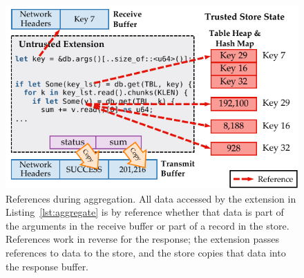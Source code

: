 \begin{figure}[t]
  \includegraphics[width=1.0\columnwidth]{figures/tao-extension.pdf}
  \vspace{2pt}
  \caption{References during aggregation. All data accessed by the extension in
  Listing~\ref{lst:aggregate} is by reference whether that data is part of the
  arguments in the receive buffer or part of a record in the store. References
  work in reverse for the response; the extension passes references to data to
  the store, and the store copies that data into the response buffer.}
  \label{fig:tao}
\end{figure}
